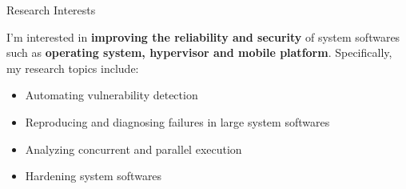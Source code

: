 \begin{rSection}{Research Interests}
\newcommand{\eg}{\textit{e}.\textit{g}.\xspace}

I'm interested in \textbf{improving the reliability and security} of
system softwares such as \textbf{operating system, hypervisor and mobile
  platform}. Specifically, my research topics include:

\begin{itemize}[leftmargin=*,itemsep=-5pt]
\item{Automating vulnerability detection}
\item{Reproducing and diagnosing failures in large system softwares}
\item{Analyzing concurrent and parallel execution}
\item{Hardening system softwares}
\end{itemize}

\end{rSection}
